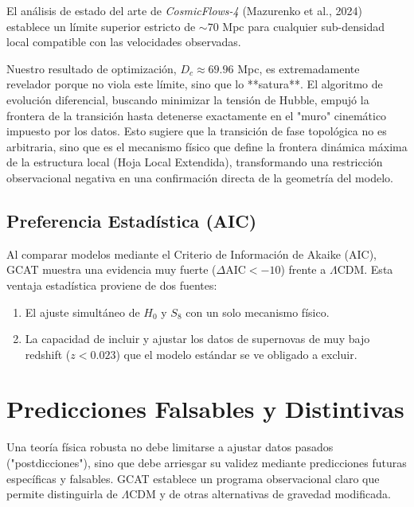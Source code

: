 \documentclass[12pt, a4paper]{article}
\theoremstyle{plain}
\theoremstyle{definition}
\begin{document}
El análisis de estado del arte de \textit{CosmicFlows-4} (Mazurenko et al., 2024) establece un límite superior estricto de $\sim 70$ Mpc para cualquier sub-densidad local compatible con las velocidades observadas.

Nuestro resultado de optimización, $D_c \approx 69.96$ Mpc, es extremadamente revelador porque no viola este límite, sino que lo **satura**. El algoritmo de evolución diferencial, buscando minimizar la tensión de Hubble, empujó la frontera de la transición hasta detenerse exactamente en el "muro" cinemático impuesto por los datos. Esto sugiere que la transición de fase topológica no es arbitraria, sino que es el mecanismo físico que define la frontera dinámica máxima de la estructura local (Hoja Local Extendida), transformando una restricción observacional negativa en una confirmación directa de la geometría del modelo.

\subsection{Preferencia Estadística (AIC)}

Al comparar modelos mediante el Criterio de Información de Akaike (AIC), GCAT muestra una evidencia muy fuerte ($\Delta \text{AIC} < -10$) frente a $\Lambda$CDM. Esta ventaja estadística proviene de dos fuentes:
\begin{enumerate}
    \item El ajuste simultáneo de $H_0$ y $S_8$ con un solo mecanismo físico.
    \item La capacidad de incluir y ajustar los datos de supernovas de muy bajo redshift ($z < 0.023$) que el modelo estándar se ve obligado a excluir.
\end{enumerate}

\section{Predicciones Falsables y Distintivas}
\label{sec:predicciones}

Una teoría física robusta no debe limitarse a ajustar datos pasados ("postdicciones"), sino que debe arriesgar su validez mediante predicciones futuras específicas y falsables. GCAT establece un programa observacional claro que permite distinguirla de $\Lambda$CDM y de otras alternativas de gravedad modificada.
\end{document}
